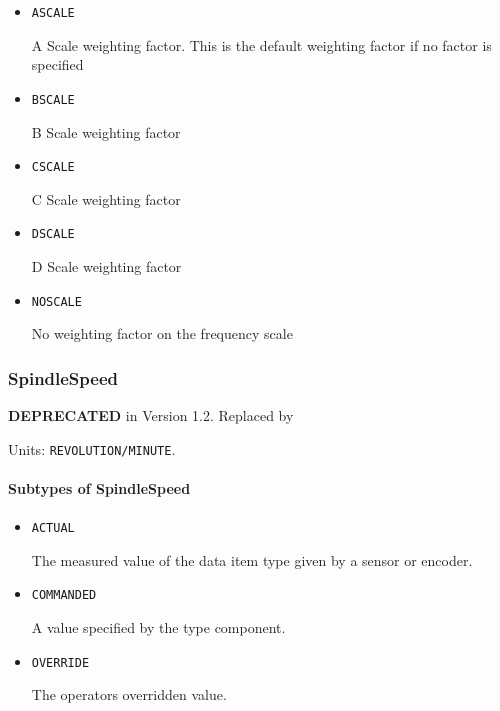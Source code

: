 \begin{itemize}

\item \texttt{A\textunderscore SCALE}


A Scale weighting factor.   This is the default weighting factor if no factor is specified

\item \texttt{B\textunderscore SCALE}


B Scale weighting factor

\item \texttt{C\textunderscore SCALE}


C Scale weighting factor

\item \texttt{D\textunderscore SCALE}


D Scale weighting factor

\item \texttt{NO\textunderscore SCALE}


No weighting factor on the frequency scale


\end{itemize}

\subsubsection{SpindleSpeed}
\label{sec:SpindleSpeed}



\textbf{DEPRECATED} in Version 1.2.  Replaced by 


Units: \texttt{REVOLUTION/MINUTE}.

\paragraph{Subtypes of SpindleSpeed}\mbox{}
\label{sec:Subtypes of SpindleSpeed}

\begin{itemize}

\item \texttt{ACTUAL}


The measured value of the data item type given by a sensor or encoder.

\item \texttt{COMMANDED}


A value specified by the  type component.

\item \texttt{OVERRIDE}


The operators overridden value.


\end{itemize}

